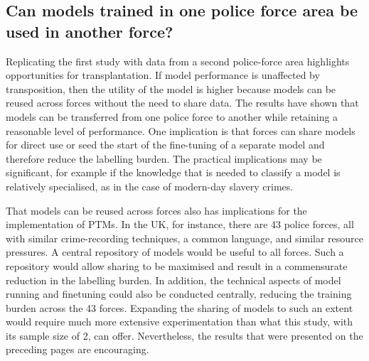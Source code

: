 \subsection{Can models trained in one police force area be used in another force?} Replicating the first study with data from a second police-force area highlights opportunities for transplantation. If model performance is unaffected by transposition, then the utility of the model is higher because models can be reused across forces without the need to share data. The results have shown that models can be transferred from one police force to another while retaining a reasonable level of performance. One implication is that forces can share models for direct use or seed the start of the fine-tuning of a separate model and therefore reduce the labelling burden. The practical implications may be significant, for example if the knowledge that is needed to classify a model is relatively specialised, as in the case of modern-day slavery crimes.

That models can be reused across forces also has implications for the implementation of PTMs. In the UK, for instance, there are 43 police forces, all with similar crime-recording techniques, a common language, and similar resource pressures. A central repository of models would be useful to all forces. Such a repository would allow sharing to be maximised and result in a commensurate reduction in the labelling burden. In addition, the technical aspects of model running and finetuning could also be conducted centrally, reducing the training burden across the 43 forces. Expanding the sharing of models to such an extent would require much more extensive experimentation than what this study, with its sample size of 2, can offer. Nevertheless, the results that were presented on the preceding pages are encouraging.


